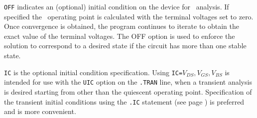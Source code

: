 \newpage

\begin{widelist}
\item[{\tt OFF}] indicates an (optional) initial condition on the device for
\dc\ analysis.
If specified the \dc\ operating point is calculated with the terminal voltages
set to zero.  Once convergence is obtained, the
program continues to iterate to obtain the exact  value of
the  terminal  voltages.  The OFF option is used to enforce the solution
to  correspond  to  a  desired  state if the circuit has more than one stable
state.
\item[{\tt IC}] is the optional  initial condition specification.
Using {\tt IC=}$V_{DS},V_{GS}, V_{BS}$
is intended for use with the {\tt UIC} option
on  the  {\tt .TRAN}  line,  when  a transient analysis is desired
starting from other than the quiescent operating point.
Specification of the transient initial conditions using the {\tt .IC}
statement (see page \pageref{.ICstatement}) is preferred and is more
convenient.
\end{widelist}





